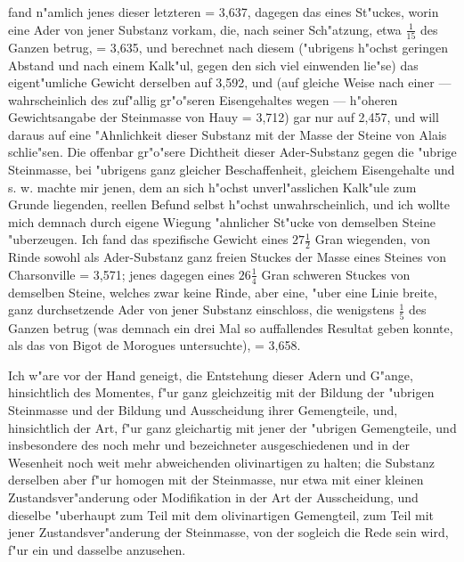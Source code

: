 \documentclass[a4paper, 11pt, oneside, german]{article}
\begin{document}
{{fand n"amlich jenes dieser letzteren = 3,637, dagegen das eines St"uckes, worin eine Ader von jener Substanz vorkam, die, nach seiner Sch"atzung, etwa $\frac{1}{15}$ des Ganzen betrug, = 3,635, und berechnet nach diesem ("ubrigens h"ochst geringen Abstand und nach einem Kalk"ul, gegen den sich viel einwenden lie"se) das eigent"umliche Gewicht derselben auf 3,592, und (auf gleiche Weise nach einer --- wahrscheinlich des zuf"allig gr"o"seren Eisengehaltes wegen --- h"oheren Gewichtsangabe der Steinmasse von Hauy = 3,712) gar nur auf 2,457, und will daraus auf eine "Ahnlichkeit dieser Substanz mit der Masse der Steine von Alais schlie"sen. Die offenbar gr"o"sere Dichtheit dieser Ader-Substanz gegen die "ubrige Steinmasse, bei "ubrigens ganz gleicher Beschaffenheit, gleichem Eisengehalte und s. w. machte mir jenen, dem an sich h"ochst unverl"asslichen Kalk"ule zum Grunde liegenden, reellen Befund selbst h"ochst unwahrscheinlich, und ich wollte mich demnach durch eigene Wiegung "ahnlicher St"ucke von demselben Steine "uberzeugen. Ich fand das spezifische Gewicht eines $27\frac{1}{2}$ Gran wiegenden, von Rinde sowohl als Ader-Substanz ganz freien Stuckes der Masse eines Steines von Charsonville = 3,571; jenes dagegen eines $26\frac{1}{4}$ Gran schweren Stuckes von demselben Steine, welches zwar keine Rinde, aber eine, "uber eine Linie breite, ganz durchsetzende Ader von jener Substanz einschloss, die wenigstens $\frac{1}{5}$ des Ganzen betrug (was demnach ein drei Mal so auffallendes Resultat geben konnte, als das von Bigot de Morogues untersuchte), = 3,658.}}

Ich w"are vor der Hand geneigt, die Entstehung dieser Adern und G"ange, hinsichtlich des Momentes, f"ur ganz gleichzeitig mit der Bildung der "ubrigen Steinmasse und der Bildung und Ausscheidung ihrer Gemengteile, und, hinsichtlich der Art, f"ur ganz gleichartig mit jener der "ubrigen Gemengteile, und insbesondere des noch mehr und bezeichneter ausgeschiedenen und in der Wesenheit noch weit mehr abweichenden olivinartigen zu halten; die Substanz derselben aber f"ur homogen mit der Steinmasse, nur etwa mit einer kleinen Zustandsver"anderung oder Modifikation in der Art der Ausscheidung, und dieselbe "uberhaupt zum Teil mit dem olivinartigen Gemengteil, zum Teil mit jener Zustandsver"anderung der Steinmasse, von der sogleich die Rede sein wird, f"ur ein und dasselbe anzusehen.
\end{document}
